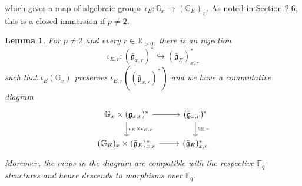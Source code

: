 \documentclass[11 pt]{article}
\numberwithin{equation}{subsection}
\newtheorem{lemma}[theorem]{Lemma}
\theoremstyle{definition}
\theoremstyle{remark}
\theoremstyle{conjecture}
\newcommand{\bg}{\bar{\mathfrak g}}
\newcommand{\R}{\mathbb R}
\newcommand{\F}{\mathbb F}
\newcommand{\G}{\mathbb G}
\begin{document}
which gives a map of algebraic groups $\iota_E: \G_x \longrightarrow(\G_E)_x$. As noted in \cite{fintzenmoyprasad} Section 2.6, this is a closed immersion if $p\neq 2$.
\begin{lemma}\label{lemmaGIT}
    For $p\neq 2$ and every $r \in \R_{>0}$, there is an injection 
    \begin{equation}
        \iota_{E,r}:(\bg_{x,r})^*\hookrightarrow  (\bg_E)_{x,r}^*
    \end{equation}
    such that $\iota_E(\G_x)$ preserves $\iota_{E,r}((\bg_{x,r})^*)$ and we have a commutative diagram 
    \begin{equation}
        \begin{tikzcd}
            \G_x \times (\bg_{x,r})^*\arrow{r} \arrow{d}{\iota_E\times \iota_{E,r}} &(\bg_{x,r})^*\arrow{d}{\iota_{E,r}} \\
             (\G_E)_x\times (\bg_E)_{x,r}^* \arrow{r} &(\bg_E)_{x,r}^*
        \end{tikzcd}
    \end{equation}
    Moreover, the maps in the diagram are compatible with the respective $\F_q$-structures and hence descends to morphisms over $\F_q$. 
\end{lemma}
\end{document}
